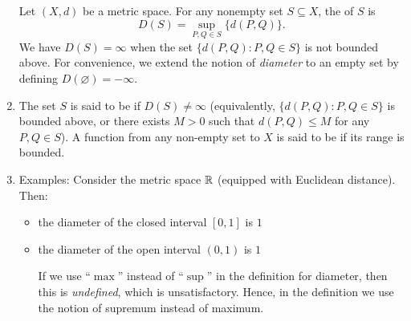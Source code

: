 \begin{enumerate}
Let \((X,d)\) be a metric space. For any nonempty set \(S\subseteq X\), the
 of \(S\) is
\[
D(S)=\sup_{P,Q\in S}\{d(P,Q)\}.
\]
We have \(D(S)=\infty\) when the set \(\{d(P,Q):P,Q\in S\}\) is not bounded
above. For convenience, we extend the notion of \emph{diameter} to an empty
set by defining \(D(\varnothing)=-\infty\).

\item The set \(S\) is said to be  if \(D(S)\ne\infty\) (equivalently,
\(\{d(P,Q):P,Q\in S\}\) is bounded above, or there exists \(M>0\) such that
\(d(P,Q)\le M\) for any \(P,Q\in S\)). A function from any non-empty set to \(X\)
is said to be  if its range is bounded.

\item Examples: Consider the metric space \(\mathbb{R}\) (equipped with Euclidean
distance). Then:
\begin{itemize}
\item the diameter of the closed interval \([0,1]\) is \(1\)
\item the diameter of the open interval \((0,1)\) is \(1\) \begin{note}
If we use ``\(\max\)'' instead of ``\(\sup\)'' in the definition for diameter,
then this is \emph{undefined}, which is unsatisfactory. Hence, in the
definition we use the notion of supremum instead of maximum.
\end{note}
\end{itemize}
\end{enumerate}
